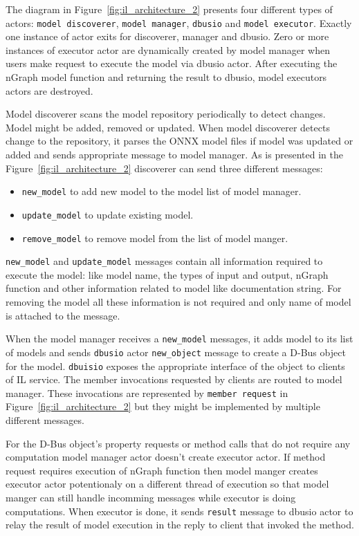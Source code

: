 \documentclass[english, 12pt, a4paper, elec, utf8, online]{aaltothesis}
\begin{document}
The diagram in Figure~\ref{fig:il_architecture_2} presents four different types of actors: \texttt{model discoverer}, \texttt{model manager}, \texttt{dbusio} and \texttt{model executor}. Exactly one instance of actor exits for discoverer, manager and dbusio. Zero or more instances of executor actor are dynamically created by model manager when users make request to execute the model via dbusio actor. After executing the nGraph model function and returning the result to dbusio, model executors actors are destroyed.         

Model discoverer scans the model repository periodically to detect changes. Model might be added, removed or updated. When model discoverer detects change to the repository, it parses the ONNX model files if model was updated or added and sends appropriate message to model manager. As is presented in the Figure~\ref{fig:il_architecture_2} discoverer can send three different messages:
\begin{itemize}
\item \texttt{new\_model} to add new model to the model list of model manager.
\item \texttt{update\_model} to update existing model.
\item \texttt{remove\_model} to remove model from the list of model manger.  
\end{itemize}

\texttt{new\_model} and \texttt{update\_model} messages contain all information required to execute the model: like model name, the types of input and output, nGraph function and other information related to model like documentation string. For removing the model all these information is not required and only name of model is attached to the message. 

When the model manager receives a \texttt{new\_model} messages, it adds model to its list of models and sends \texttt{dbusio} actor \texttt{new\_object} message to create a D-Bus object for the model. \texttt{dbuisio} exposes the appropriate interface of the object to clients of IL service. The member invocations requested by clients are routed to model manager. These invocations are represented by \texttt{member request} in Figure~\ref{fig:il_architecture_2} but they might be implemented by multiple different messages. 

For the D-Bus object's property requests or method calls that do not require any computation model manager actor doesn't create executor actor. If method request requires execution of nGraph function then model manger creates executor actor potentionaly on a different thread of execution so that model manger can still handle incomming messages while executor is doing computations. When executor is done, it sends \texttt{result} message to dbusio actor to relay the result of model execution in the reply to client that invoked the method.                      
\newpage
\end{document}
